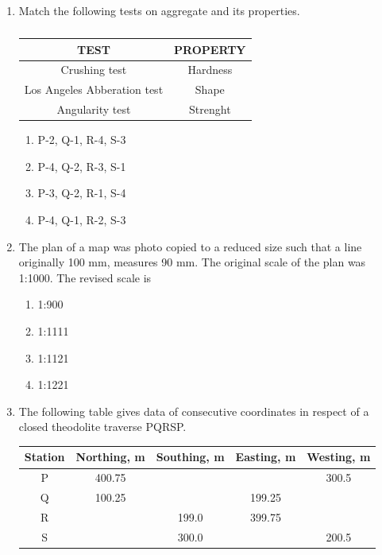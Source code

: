 \documentclass[journal,12pt,onecolumn]{IEEEtran}
\theoremstyle{remark}
\begin{document}
\begin{enumerate}
\item Match the following tests on aggregate and its properties.
\begin{table}[H]
\centering
\begin{tabular}{c|c}
TEST & PROPERTY \\
\hline
Crushing test & Hardness \\
\hline
Los Angeles Abberation test & Shape \\
\hline
Angularity test & Strenght \\
\end{tabular}
\caption*{}
\label{tab:Q.64}
\end{table}
\hfill{}
\begin{enumerate}
\item P-2, Q-1, R-4, S-3
\item P-4, Q-2, R-3, S-1
\item P-3, Q-2, R-1, S-4
\item P-4, Q-1, R-2, S-3
\end{enumerate}

\item The plan of a map was photo copied to a reduced size such that a line originally 100 mm, measures 90 mm. The original scale of the plan was 1:1000. The revised scale is

\hfill{}
\begin{enumerate}
\item 1:900
\item 1:1111
\item 1:1121
\item 1:1221
\end{enumerate}

\item The following table gives data of consecutive coordinates in respect of a closed theodolite traverse PQRSP.

\begin{table}[H]
\centering
\begin{tabular}{|c|c|c|c|c|}
\hline
Station & Northing, m & Southing, m & Easting, m & Westing, m \\
\hline
P & 400.75 &        &         & 300.5 \\
Q & 100.25 &        & 199.25  &        \\
R &        & 199.0  & 399.75  &        \\
S &        & 300.0  &         & 200.5 \\
\hline
\end{tabular}
\end{table}


\end{enumerate}
\end{document}

